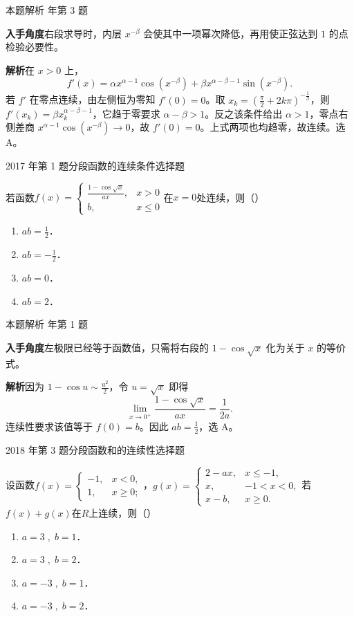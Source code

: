 \documentclass[UTF8,zihao=-4,fontset=fandol]{ctexart}
\renewcommand{\lim}{\operatorname*{lim}\limits}
\newcommand{\pickout}{\hfill（\hspace{1.4em}）}
\newenvironment{abcd}{\begin{enumerate}[label=\textup{(\Alph*)},leftmargin=2.3em,itemsep=1pt,topsep=4pt,parsep=1pt]}{\end{enumerate}}
\newcommand{\QuestionPage}[6]{%
  \par\noindent\begin{minipage}{\linewidth}
  \raggedright
  {\small\textcolor{black!60}{#3\quad #5}\hfill\textcolor{accent}{#2}}\par\smallskip}
\newcommand{\QuestionEnd}{\end{minipage}\par\medskip}
\newcommand{\QuestionPage}[6]{%
  \clearpage
  {\small\textcolor{accent}{#1\hfill #2}}\par\medskip
  {\small\textcolor{black!60}{#3\quad #5\hfill #6}}\par\vspace{9bp}}
\newcommand{\QuestionEnd}{}
\newenvironment{QuestionSolution}[1]{%
  \clearpage
  {\small\textcolor{black!60}{本题解析\quad #1}}\par\medskip
}{\par\clearpage}
\begin{document}
\begin{QuestionSolution}{2015 年第 3 题}
\textbf{入手角度}\quad 右段求导时，内层 \(x^{-\beta}\) 会使其中一项幂次降低，再用使正弦达到 \(1\) 的点检验必要性。

\textbf{解析}\quad 在 \(x>0\) 上，
\[
f'(x)=\alpha x^{\alpha-1}\cos(x^{-\beta})
+\beta x^{\alpha-\beta-1}\sin(x^{-\beta}).
\]
若 \(f'\) 在零点连续，由左侧恒为零知 \(f'(0)=0\)。取 \(x_k=(\frac{\pi}{2}+2k\pi)^{-\frac{1}{\beta}}\)，则 \(f'(x_k)=\beta x_k^{\alpha-\beta-1}\)，它趋于零要求 \(\alpha-\beta>1\)。反之该条件给出 \(\alpha>1\)，零点右侧差商 \(x^{\alpha-1}\cos(x^{-\beta})\to0\)，故 \(f'(0)=0\)。上式两项也均趋零，故连续。选 A。
\end{QuestionSolution}

\QuestionPage{1.5 连续函数}{选择题}{2017 年第 1 题}{1}{分段函数的连续条件}{044 / 234}
若函数$f(x) = \begin{cases}
  \frac{1 - \cos \sqrt{x}}{ax}, & x > 0 \\
                             b, & x \le 0
\end{cases}$在$x = 0$处连续，则\pickout{}
\begin{abcd}
\item $ab = \frac{1}{2}$．
\item $ab = - \frac{1}{2}$．
\item $ab = 0$．
\item $ab = 2$．
\end{abcd}
\QuestionEnd

\begin{QuestionSolution}{2017 年第 1 题}
\textbf{入手角度}\quad 左极限已经等于函数值，只需将右段的 \(1-\cos\sqrt{x}\) 化为关于 \(x\) 的等价式。

\textbf{解析}\quad 因为 \(1-\cos u\sim \frac{u^2}{2}\)，令 \(u=\sqrt{x}\) 即得
\[
\lim_{x\to0^+}\frac{1-\cos\sqrt{x}}{ax}=\frac1{2a}.
\]
连续性要求该值等于 \(f(0)=b\)。因此 \(\boxed{ab=\frac{1}{2}}\)，选 A。
\end{QuestionSolution}

\QuestionPage{1.5 连续函数}{选择题}{2018 年第 3 题}{1}{分段函数和的连续性}{045 / 234}
设函数$f(x) = \begin{cases}
  -1, & x < 0, \\
   1, & x \ge 0;
\end{cases}$，$g(x) = \begin{cases}
  2 - ax, & x \le - 1, \\
       x, & -1 < x < 0, \\
   x - b, & x \ge 0.
\end{cases}$若$f(x) + g(x)$在$R$上连续，则\pickout{}
\begin{abcd}
\item $a = 3\;,\;b = 1$．
\item $a = 3\;,\;b = 2$．
\item $a = - 3\;,\;b = 1$．
\item $a = - 3\;,\;b = 2$．
\end{abcd}
\QuestionEnd
\end{document}
